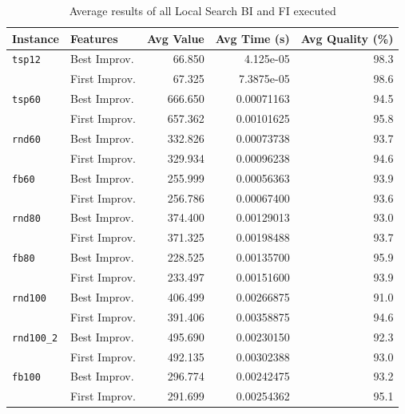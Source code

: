 	\begin{table}[H]
		
		\begin{tabular}{llrrr}
			\toprule
			\textbf{Instance} & \textbf{Features} & \textbf{Avg Value} & \textbf{Avg Time (s)} & \textbf{Avg Quality} (\%) \\
			\midrule
			\verb|tsp12| 	& Best Improv. & 66.850 & 4.125e-05 & 98.3 \\
			& First Improv. & 67.325 & 7.3875e-05 & 98.6 \\
			\midrule
			\verb|tsp60| 	& Best Improv. & 666.650 & 0.00071163 & 94.5 \\
			& First Improv. & 657.362 & 0.00101625 & 95.8 \\
			\midrule
			\verb|rnd60| 	& Best Improv. & 332.826 & 0.00073738 & 93.7 \\
							& First Improv. & 329.934 & 0.00096238 & 94.6 \\
			\midrule
			\verb|fb60|		& Best Improv. & 255.999 & 0.00056363 & 93.9 \\
							& First Improv. & 256.786 & 0.00067400 & 93.6 \\ 
			\midrule
			\verb|rnd80| 	& Best Improv. & 374.400 & 0.00129013 & 93.0 \\
							& First Improv. & 371.325 & 0.00198488 & 93.7 \\
			\midrule
			\verb|fb80|		& Best Improv. & 228.525 & 0.00135700 & 95.9 \\
							& First Improv. & 233.497 & 0.00151600 &  93.9 \\
			\midrule
			\verb|rnd100| 	& Best Improv. & 406.499 & 0.00266875 & 91.0 \\
							& First Improv. & 391.406 & 0.00358875 & 94.6 \\
			\midrule
			\verb|rnd100_2| & Best Improv. & 495.690 & 0.00230150 & 92.3 \\
							& First Improv. & 492.135 & 0.00302388 & 93.0 \\
			\midrule
			\verb|fb100| & Best Improv. & 296.774 & 0.00242475 & 93.2 \\
						& First Improv. & 291.699 & 0.00254362 & 95.1 \\
			\bottomrule
		\end{tabular}
		\caption{\label{tab:AvgResultLS}Average results of all Local Search BI and FI executed}
	\end{table}
	
